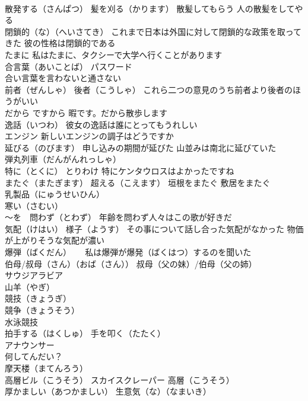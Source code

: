 \documentclass[8pt]{extreport}
\begin{document}
\begin{CJK}{UTF8}{min}
\\	散発する（さんぱつ） 髪を刈る（かります） 散髪してもらう 人の散髪をしてやる
\\	閉鎖的（な）（へいさてき） これまで日本は外国に対して閉鎖的な政策を取ってきた 彼の性格は閉鎖的である
\\	たまに 私はたまに、タクシーで大学へ行くことがあります
\\	合言葉（あいことば） パスワード 
\\	合い言葉を言わないと通さない
\\	前者（ぜんしゃ） 後者（こうしゃ） これら二つの意見のうち前者より後者のほうがいい
\\	だから ですから 暇です。だから散歩します
\\	逸話（いつわ） 彼女の逸話は誰にとってもうれしい
\\	エンジン 新しいエンジンの調子はどうですか
\\	延びる（のびます） 申し込みの期間が延びた 山並みは南北に延びていた
\\	弾丸列車（だんがんれっしゃ） 
\\	特に（とくに） とりわけ 特にケンタウロスはよかったですね
\\	またぐ（またぎます） 超える（こえます） 垣根をまたぐ 敷居をまたぐ
\\	乳製品（にゅうせいひん）
\\	寒い（さむい）
\\	～を　問わず（とわず） 年齢を問わず人々はこの歌が好きだ
\\	気配（けはい） 様子（ようす） その事について話し合った気配がなかった 物価が上がりそうな気配が濃い
\\	爆弾（ばくだん） 　 私は爆弾が爆発（ばくはつ）するのを聞いた
\\	伯母/叔母（さん）（おば（さん）） 叔母（父の妹）/伯母（父の姉）
\\	サウジアラビア
\\	山羊（やぎ）
\\	競技（きょうぎ）
\\	競争（きょうそう）
\\	水泳競技
\\	拍手する（はくしゅ） 手を叩く（たたく）
\\	アナウンサー
\\	何してんだい？
\\	摩天楼（まてんろう）
\\	高層ビル（こうそう） スカイスクレーパー 高層（こうそう） 
\\	厚かましい（あつかましい） 生意気（な）（なまいき）

\end{CJK}
\end{document}

